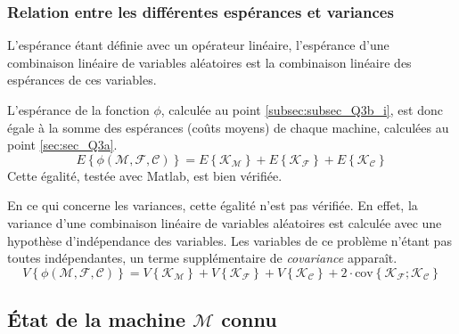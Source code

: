 \documentclass[a4paper, 12pt]{article}
\newcommand{\M}{\mathcal{M}}
\newcommand{\F}{\mathcal{F}}
\newcommand{\C}{\mathcal{C}}
\newcommand{\K}{\mathcal{K}}
\begin{document}
	\subsubsection{Relation entre les différentes espérances et variances}
	L'espérance étant définie avec un opérateur linéaire, l'espérance d'une combinaison linéaire de variables aléatoires est la combinaison linéaire des espérances de ces variables.\par
	L'espérance de la fonction \(\phi\), calculée au point \ref{subsec:subsec_Q3b_i}, est donc égale à la somme des espérances (coûts moyens) de chaque machine, calculées au point \ref{sec:sec_Q3a}.
	\begin{displaymath}
	    E\left\{\phi\left(\M, \F, \C\right)\right\} = E\left\{\K_\M\right\} + E\left\{\K_\F\right\} + E\left\{\K_\C\right\}
	\end{displaymath}
	Cette égalité, testée avec Matlab, est bien vérifiée.\par
	En ce qui concerne les variances, cette égalité n'est pas vérifiée. En effet, la variance d'une combinaison linéaire de variables aléatoires est calculée avec une hypothèse d'indépendance des variables. Les variables de ce problème n'étant pas toutes indépendantes, un terme supplémentaire de \textit{covariance} apparaît.
	\begin{displaymath}
	    V\left\{\phi\left(\M, \F, \C\right)\right\} = V\left\{\K_\M\right\} + V\left\{\K_\F\right\} + V\left\{\K_\C\right\} + 2\cdot\text{cov}\left\{\K_\F;\K_\C\right\}
	\end{displaymath}
	\subsection{État de la machine \(\M\) connu}
\end{document}
